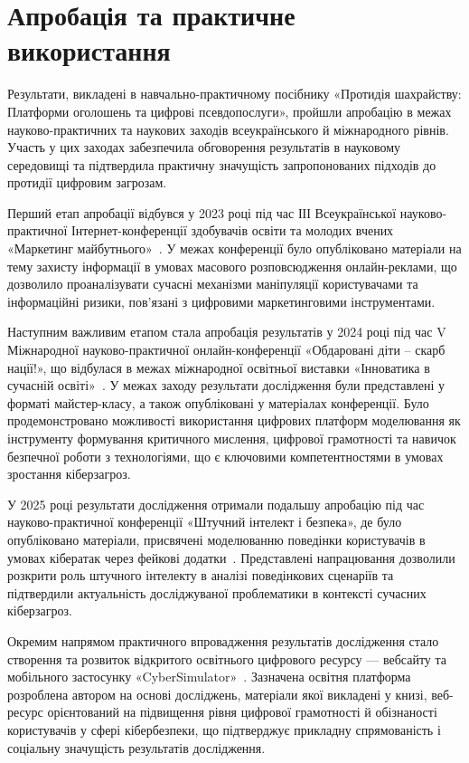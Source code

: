 ﻿\makeatletter
\chapter*{Апробація та практичне використання}
\makeatother

Результати, викладені в навчально-практичному посібнику «Протидія шахрайству: Платформи оголошень та цифровi псевдопослуги», пройшли апробацію в межах науково-практичних та наукових заходів всеукраїнського й міжнародного рівнів. Участь у цих заходах забезпечила обговорення результатів в науковому середовищі та підтвердила практичну значущість запропонованих підходів до протидії цифровим загрозам.

Перший етап апробації відбувся у 2023 році під час ІІІ Всеукраїнської науково-практичної Інтернет-конференції здобувачів освіти та молодих вчених «Маркетинг майбутнього»~\cite{Evdokymov2023}. У межах конференції було опубліковано матеріали на тему захисту інформації в умовах масового розповсюдження онлайн-реклами, що дозволило проаналізувати сучасні механізми маніпуляції користувачами та інформаційні ризики, пов’язані з цифровими маркетинговими інструментами. 

Наступним важливим етапом стала апробація результатів у 2024 році під час V Міжнародної науково-практичної онлайн-конференції «Обдаровані діти – скарб нації!», що відбулася в межах міжнародної освітньої виставки «Інноватика в сучасній освіті»~\cite{Yevdokymov2024}. У межах заходу результати дослідження були представлені у форматі майстер-класу, а також опубліковані у матеріалах конференції. Було продемонстровано можливості використання цифрових платформ моделювання як інструменту формування критичного мислення, цифрової грамотності та навичок безпечної роботи з технологіями, що є ключовими компетентностями в умовах зростання кіберзагроз.

У 2025 році результати дослідження отримали подальшу апробацію під час науково-практичної конференції «Штучний інтелект і безпека», де було опубліковано матеріали, присвячені моделюванню поведінки користувачів в умовах кібератак через фейкові додатки~\cite{Yevdokymov2025AI}. Представлені напрацювання дозволили розкрити роль штучного інтелекту в аналізі поведінкових сценаріїв та підтвердили актуальність досліджуваної проблематики в контексті сучасних кіберзагроз.

Окремим напрямом практичного впровадження результатів дослідження стало створення та розвиток відкритого освітнього цифрового ресурсу — вебсайту та мобільного застосунку «CyberSimulator»~\cite{SimulatorESA}. Зазначена освітня платформа розроблена автором на основі досліджень, матеріали якої викладені у книзі, веб-ресурс орієнтований на підвищення рівня цифрової грамотності й обізнаності користувачів у сфері кібербезпеки, що підтверджує прикладну спрямованість і соціальну значущість результатів дослідження.

